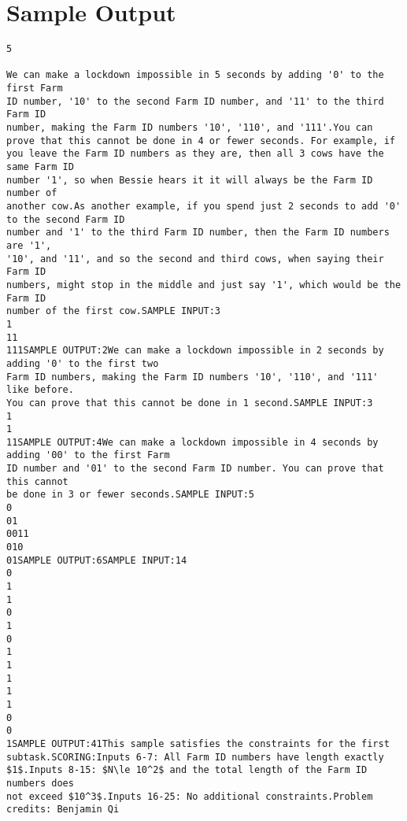 \documentclass[12pt]{article}
\begin{document}
\section*{Sample Output}
\begin{verbatim}
5

We can make a lockdown impossible in 5 seconds by adding '0' to the first Farm
ID number, '10' to the second Farm ID number, and '11' to the third Farm ID
number, making the Farm ID numbers '10', '110', and '111'.You can prove that this cannot be done in 4 or fewer seconds. For example, if
you leave the Farm ID numbers as they are, then all 3 cows have the same Farm ID
number '1', so when Bessie hears it it will always be the Farm ID number of
another cow.As another example, if you spend just 2 seconds to add '0' to the second Farm ID
number and '1' to the third Farm ID number, then the Farm ID numbers are '1',
'10', and '11', and so the second and third cows, when saying their Farm ID
numbers, might stop in the middle and just say '1', which would be the Farm ID
number of the first cow.SAMPLE INPUT:3
1
11
111SAMPLE OUTPUT:2We can make a lockdown impossible in 2 seconds by adding '0' to the first two
Farm ID numbers, making the Farm ID numbers '10', '110', and '111' like before.
You can prove that this cannot be done in 1 second.SAMPLE INPUT:3
1
1
11SAMPLE OUTPUT:4We can make a lockdown impossible in 4 seconds by adding '00' to the first Farm
ID number and '01' to the second Farm ID number. You can prove that this cannot
be done in 3 or fewer seconds.SAMPLE INPUT:5
0
01
0011
010
01SAMPLE OUTPUT:6SAMPLE INPUT:14
0
1
1
0
1
0
1
1
1
1
1
0
0
1SAMPLE OUTPUT:41This sample satisfies the constraints for the first subtask.SCORING:Inputs 6-7: All Farm ID numbers have length exactly $1$.Inputs 8-15: $N\le 10^2$ and the total length of the Farm ID numbers does
not exceed $10^3$.Inputs 16-25: No additional constraints.Problem credits: Benjamin Qi


\end{verbatim}
\end{document}

